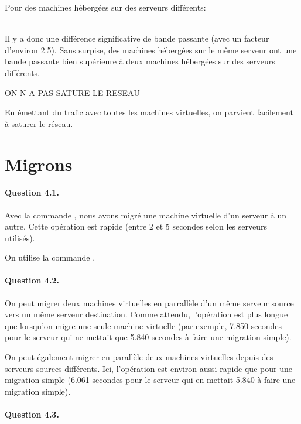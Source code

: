 \documentclass[12pt]{article}
\begin{document}
Pour des machines hébergées sur des serveurs différents:

\\

Il y a donc une différence significative de bande passante (avec un facteur d'environ 2.5). Sans surpise, des machines hébergées sur le même serveur ont une bande passante bien supérieure à deux machines hébergées sur des serveurs différents.

ON N A PAS SATURE LE RESEAU

En émettant du trafic avec toutes les machines virtuelles, on parvient facilement à saturer le réseau.

\section{Migrons}
\paragraph{Question 4.1.}


Avec la commande , nous avons migré une machine virtuelle d'un serveur à un autre. Cette opération est rapide (entre 2 et 5 secondes selon les serveurs utilisés).

On utilise la commande .

\paragraph{Question 4.2.}

On peut migrer deux machines virtuelles en parrallèle d'un même serveur source vers un même serveur destination. Comme attendu, l'opération est plus longue que lorsqu'on migre une seule machine virtuelle (par exemple, 7.850 secondes pour le serveur qui ne mettait que 5.840 secondes à faire une migration simple).


On peut également migrer en parallèle deux machines virtuelles depuis des serveurs sources différents. Ici, l'opération est environ aussi rapide que pour une migration simple (6.061 secondes pour le serveur qui en mettait 5.840 à faire une migration simple).



\paragraph{Question 4.3.}
\end{document}
